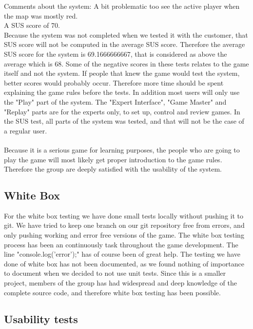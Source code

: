 Comments about the system: A bit problematic too see the active player when the map was mostly red.\\

A SUS score of 70.\\

Because the system was not completed when we tested it with the customer, that SUS score will not be computed in the average SUS score. Therefore the average SUS score for the system is 69.1666666667, that is considered as above the average which is 68. Some of the negative scores in these tests relates to the game itself and not the system. If people that knew the game would test the system, better scores would probably occur. Therefore more time should be spent explaining the game rules before the tests. In addition most users will only use the "Play" part of the system. The "Expert Interface", "Game Master" and "Replay" parts are for the experts only, to set up, control and review games. In the SUS test, all parts of the system was tested, and that will not be the case of a regular user.\\
\\
Because it is a serious game for learning purposes, the people who are going to play the game will most likely get proper introduction to the game rules. Therefore the group are deeply satisfied with the usability of the system. 
\subsection{White Box}
For the white box testing we have done small tests locally without pushing it to git. We have tried to keep one branch on our git repository free from errors, and only pushing working and error free versions of the game. The white box testing process has been an continuously task throughout the game development. The line "console.log('error');" has of course been of great help. The testing we have done of white box  has not been documented, as we found nothing of importance to document when we decided to not use unit tests. Since this is a smaller project, members of the group has had widespread and deep knowledge of the complete source code, and therefore white box testing has been possible.




\subsection{Usability tests}


